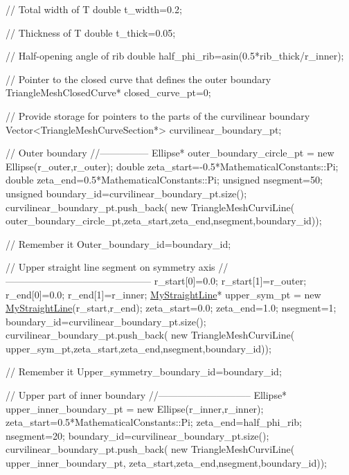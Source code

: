 \begin{DoxyCodeInclude}
  \textcolor{comment}{// Total width of T}
  \textcolor{keywordtype}{double} t\_width=0.2;

  \textcolor{comment}{// Thickness of T}
  \textcolor{keywordtype}{double} t\_thick=0.05;

  \textcolor{comment}{// Half-opening angle of rib}
  \textcolor{keywordtype}{double} half\_phi\_rib=asin(0.5*rib\_thick/r\_inner);

  \textcolor{comment}{// Pointer to the closed curve that defines the outer boundary}
  TriangleMeshClosedCurve* closed\_curve\_pt=0;
 
  \textcolor{comment}{// Provide storage for pointers to the parts of the curvilinear boundary}
  Vector<TriangleMeshCurveSection*> curvilinear\_boundary\_pt;

  \textcolor{comment}{// Outer boundary}
  \textcolor{comment}{//---------------}
  Ellipse* outer\_boundary\_circle\_pt = \textcolor{keyword}{new} Ellipse(r\_outer,r\_outer);
  \textcolor{keywordtype}{double} zeta\_start=-0.5*MathematicalConstants::Pi;
  \textcolor{keywordtype}{double} zeta\_end=0.5*MathematicalConstants::Pi;
  \textcolor{keywordtype}{unsigned} nsegment=50;
  \textcolor{keywordtype}{unsigned} boundary\_id=curvilinear\_boundary\_pt.size();
  curvilinear\_boundary\_pt.push\_back(
   \textcolor{keyword}{new} TriangleMeshCurviLine(
    outer\_boundary\_circle\_pt,zeta\_start,zeta\_end,nsegment,boundary\_id));

  \textcolor{comment}{// Remember it}
  Outer\_boundary\_id=boundary\_id;
 

  \textcolor{comment}{// Upper straight line segment on symmetry axis}
  \textcolor{comment}{//---------------------------------------------}
  r\_start[0]=0.0;
  r\_start[1]=r\_outer;
  r\_end[0]=0.0;
  r\_end[1]=r\_inner;
  \hyperlink{classMyStraightLine}{MyStraightLine}* upper\_sym\_pt = \textcolor{keyword}{new} \hyperlink{classMyStraightLine}{MyStraightLine}(r\_start,r\_end);
  zeta\_start=0.0;
  zeta\_end=1.0;
  nsegment=1;
  boundary\_id=curvilinear\_boundary\_pt.size();
  curvilinear\_boundary\_pt.push\_back(
   \textcolor{keyword}{new} TriangleMeshCurviLine(
    upper\_sym\_pt,zeta\_start,zeta\_end,nsegment,boundary\_id));
                                                        
  \textcolor{comment}{// Remember it}
  Upper\_symmetry\_boundary\_id=boundary\_id;
 
  \textcolor{comment}{// Upper part of inner boundary}
  \textcolor{comment}{//-----------------------------}
  Ellipse* upper\_inner\_boundary\_pt = 
   \textcolor{keyword}{new} Ellipse(r\_inner,r\_inner);
  zeta\_start=0.5*MathematicalConstants::Pi;
  zeta\_end=half\_phi\_rib;
  nsegment=20;
  boundary\_id=curvilinear\_boundary\_pt.size();
  curvilinear\_boundary\_pt.push\_back(
   \textcolor{keyword}{new} TriangleMeshCurviLine(
    upper\_inner\_boundary\_pt,
    zeta\_start,zeta\_end,nsegment,boundary\_id));


\end{DoxyCodeInclude}
